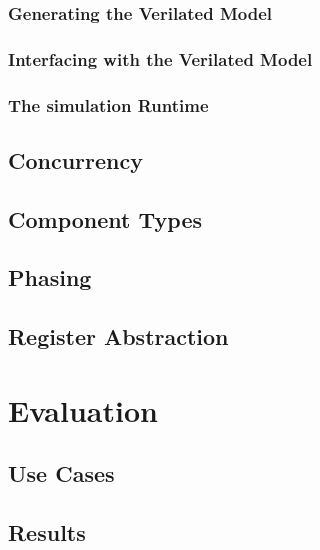 \documentclass[12pt]{book}
\begin{document}
\subsection{Generating the Verilated Model}

\subsection{Interfacing with the Verilated Model}

\subsection{The simulation Runtime}

\section{Concurrency} %

\section{Component Types}

\section{Phasing}

\section{Register Abstraction}

\chapter{Evaluation} %

\section{Use Cases} %

\section{Results} %
\end{document}
